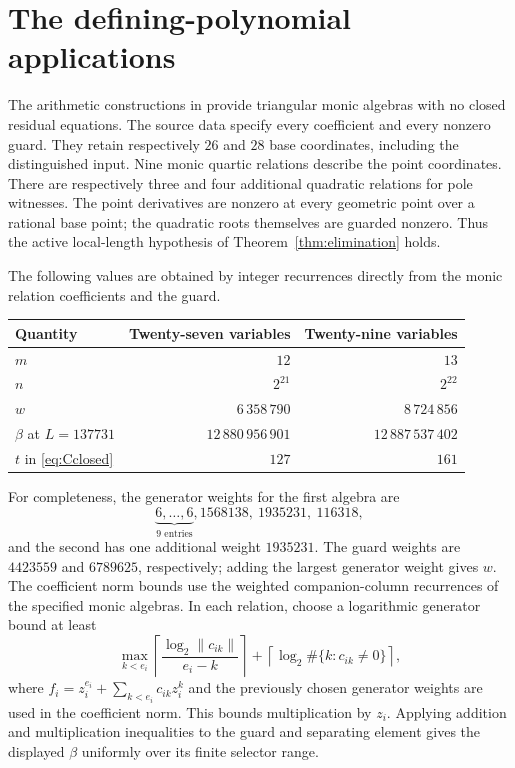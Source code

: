 \documentclass[11pt,a4paper]{article}
\begin{document}
\section{The defining-polynomial applications}

The arithmetic constructions in \cite{Source27,Source29} provide
triangular monic algebras with no closed residual equations. The
source data specify every coefficient and every nonzero guard.
They retain respectively $26$ and $28$ base coordinates, including
the distinguished input. Nine monic quartic relations describe the
point coordinates. There are respectively three and four additional
quadratic relations for pole witnesses. The point derivatives are
nonzero at every geometric point over a rational base point; the
quadratic roots themselves are guarded nonzero. Thus the active
local-length hypothesis of Theorem~\ref{thm:elimination} holds.

The following values are obtained by integer recurrences directly
from the monic relation coefficients and the guard.
\begin{center}
\begin{tabular}{lrr}
\toprule
Quantity & Twenty-seven variables & Twenty-nine variables\\
\midrule
$m$ & $12$ & $13$\\
$n$ & $2^{21}$ & $2^{22}$\\
$w$ & $6\,358\,790$ & $8\,724\,856$\\
$\beta$ at $L=137731$ & $12\,880\,956\,901$ & $12\,887\,537\,402$\\
$t$ in \eqref{eq:Cclosed} & $127$ & $161$\\
\bottomrule
\end{tabular}
\end{center}
For completeness, the generator weights for the first algebra are
\[
 \underbrace{6,\ldots,6}_{9\text{ entries}},
 1568138,\ 1935231,\ 116318,
\]
and the second has one additional weight $1935231$.
The guard weights are $4423559$ and $6789625$, respectively;
adding the largest generator weight gives $w$.
The coefficient norm bounds use the weighted companion-column
recurrences of the specified monic algebras. In each relation,
choose a logarithmic generator bound at least
\[
 \max_{k<e_i}\left\lceil
 \frac{\log_2\lVert c_{ik}\rVert}{e_i-k}\right\rceil
       +\left\lceil\log_2\#\{k:c_{ik}\ne0\}\right\rceil,
\]
where $f_i=z_i^{e_i}+\sum_{k<e_i}c_{ik}z_i^k$ and the
previously chosen generator weights are used in the coefficient
norm. This bounds multiplication by $z_i$. Applying addition and
multiplication inequalities to the guard and separating element
gives the displayed $\beta$ uniformly over its finite selector range.
\end{document}
